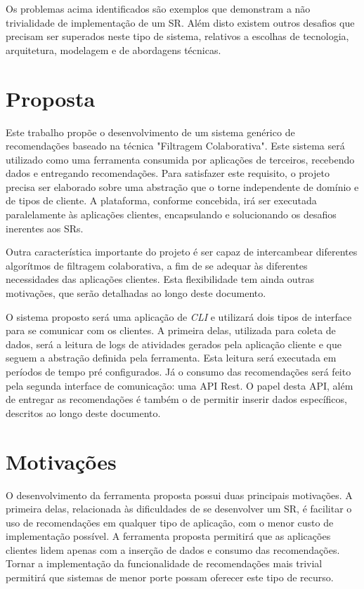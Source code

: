 \documentclass[
	12pt,				%
    oneside,			%
	a4paper,			%
	english,			%
	french,				%
	spanish,			%
	brazil,				%
	]{abntex2}
\begin{document}
Os problemas acima identificados são exemplos que demonstram a não trivialidade de implementação de um SR. Além disto existem outros desafios que precisam ser
superados neste tipo de sistema, relativos a escolhas de tecnologia, arquitetura, modelagem e de abordagens técnicas. 

\section{Proposta}
Este trabalho propõe o desenvolvimento de um sistema genérico de recomendações baseado na técnica "Filtragem Colaborativa". Este sistema será utilizado como uma ferramenta
consumida por aplicações de terceiros, recebendo dados e entregando recomendações. Para satisfazer este requisito, o projeto precisa ser elaborado sobre
uma abstração que o torne independente de domínio e de tipos de cliente. A plataforma, conforme concebida, irá ser executada paralelamente às aplicações clientes,
encapsulando e solucionando os desafios inerentes aos SRs.

Outra característica importante do projeto é ser capaz de intercambear diferentes algorítmos de filtragem colaborativa, a fim de se adequar às diferentes necessidades
das aplicações clientes. Esta flexibilidade tem ainda outras motivações, que serão detalhadas ao longo deste documento. 

O sistema proposto será uma aplicação de \textit{CLI} e utilizará dois tipos de interface para se comunicar com os clientes. A primeira delas, utilizada para coleta 
de dados, será a leitura de logs de atividades gerados pela aplicação cliente e que seguem a abstração definida pela ferramenta. Esta leitura será executada em períodos 
de tempo pré configurados. Já o consumo das recomendações será feito pela segunda interface de comunicação: uma API Rest. O papel desta API, além de entregar as
recomendações é também o de permitir inserir dados específicos, descritos ao longo deste documento. 

\section{Motivações}
O desenvolvimento da ferramenta proposta possui duas principais motivações. A primeira delas, relacionada às dificuldades de se desenvolver um SR, é facilitar o uso
de recomendações em qualquer tipo de aplicação, com o menor custo de implementação possível. A ferramenta proposta permitirá que as aplicações clientes lidem apenas
com a inserção de dados e consumo das recomendações. Tornar a implementação da funcionalidade de recomendações mais trivial permitirá que sistemas de menor porte
possam oferecer este tipo de recurso.
\end{document}
